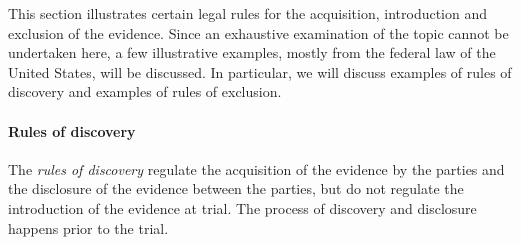\documentclass[10pt]{article}
\begin{document}
This section illustrates certain legal rules for the acquisition, introduction and exclusion of the evidence. Since an exhaustive examination of the topic cannot be undertaken here, a few illustrative examples, mostly from the federal law of the United States, will be discussed. In particular, we will discuss examples of rules of discovery and examples of rules of exclusion.  




\paragraph{Rules of discovery}
The \textit{rules of discovery} %
regulate the acquisition of the evidence by the parties and the disclosure 
of the evidence between the parties, but do not regulate the introduction of the evidence at trial. %
The process of discovery and disclosure happens prior to the trial. 
 
\end{document}
